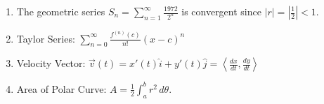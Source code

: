 \documentclass[a4paper,14pt]{article}
\begin{document}
\begin{enumerate}
\begin{enumerate}
        \item The geometric series $S_n = \sum_{n=1}^{\infty} \frac{1972}{2^n}$ is convergent since $\left|r\right| = \left|\frac{1}{2}\right| < 1$.
        
        \item Taylor Series: $\sum_{n=0}^{\infty} \frac{f^{(n)}(c)}{n!}(x-c)^n$
        
        \item Velocity Vector: $\vec{v}(t) = x'(t)\hat{i} + y'(t)\hat{j} = \left\langle \frac{dx}{dt}, \frac{dy}{dt} \right\rangle$
        
        \item Area of Polar Curve: \( A = \frac{1}{2} \int_a^b r^2 \, d\theta \).
    \end{enumerate}
\end{enumerate}
\end{document}
